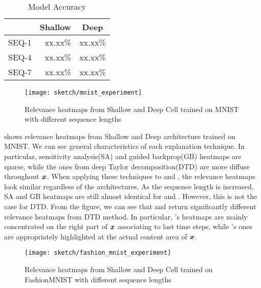 \begin{table}[]
\centering
\begin{tabular}{lrr}
\textbf{}                  & \multicolumn{1}{c}{\textbf{Shallow}} & \multicolumn{1}{c}{\textbf{Deep}} \\ \hline
\multicolumn{1}{l|}{SEQ-1} & xx.xx\%                              & xx.xx\%                           \\
\multicolumn{1}{l|}{SEQ-4} & xx.xx\%                              & xx.xx\%                            \\
\multicolumn{1}{l|}{SEQ-7} & xx.xx\%                              & xx.xx\%
\end{tabular}
\caption{Model Accuracy}
\label{tab:mnist_model_acc}
\end{table}


 \begin{figure}[h]
\centering
\texttt{[image: sketch/mnist\_experiment]}
\caption{Relevance heatmaps from Shallow and Deep Cell trained on MNIST with different sequence lengths}
\label{fig:mnist_experiment}
\end{figure}


\addfigure{\ref{fig:mnist_experiment}} shows relevance heatmaps from Shallow and Deep architecture trained on MNIST.  We can see general characteristics of each explanation technique. In particular, sensitivity analysis(SA) and guided backprop(GB) heatmaps are sparse, while the ones from deep Taylor decomposition(DTD) are more diffuse throughout $\boldsymbol{x}$.  When applying these techniques to   and , the relevance heatmaps look similar regardless of the architectures.  As the sequence length is increased, SA and GB heatmaps are still almost identical  for  and . However, this is not the case for DTD.  From the figure, we can see that  and   return significantly different relevance heatmaps from DTD method.  In particular,   's heatmaps are mainly concentrated on the right part of $\boldsymbol{x}$ associating to last time steps, while  's ones are appropriately highlighted at the actual content area of $\boldsymbol{x}$.


 \begin{figure}[h]
\centering
\texttt{[image: sketch/fashion\_mnist\_experiment]}
\caption{Relevance heatmaps from Shallow and Deep Cell trained on FashionMNIST with different sequence lengths}
\label{fig:fashion_mnist_experiment}
\end{figure}

